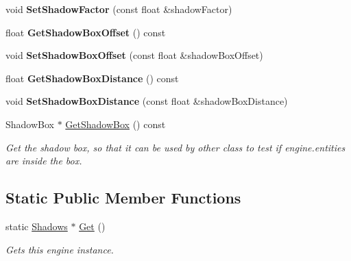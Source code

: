 \begin{DoxyCompactItemize}
\mbox{\label{class_flounder_1_1_shadows_ac793bf6b366f5bd560afdd2be13b505f}} 
void {\bfseries Set\+Shadow\+Factor} (const float \&shadow\+Factor)
\item 
\mbox{\label{class_flounder_1_1_shadows_a96f59857f80173cbdb3b1fff44bb815c}} 
float {\bfseries Get\+Shadow\+Box\+Offset} () const
\item 
\mbox{\label{class_flounder_1_1_shadows_a609e0d288ea936049fc89aec8c3bebbd}} 
void {\bfseries Set\+Shadow\+Box\+Offset} (const float \&shadow\+Box\+Offset)
\item 
\mbox{\label{class_flounder_1_1_shadows_a9a94c490ab6a8fb142e37504082078a6}} 
float {\bfseries Get\+Shadow\+Box\+Distance} () const
\item 
\mbox{\label{class_flounder_1_1_shadows_a5eef9f26b24bd85a943a4610622fa65d}} 
void {\bfseries Set\+Shadow\+Box\+Distance} (const float \&shadow\+Box\+Distance)
\item 
Shadow\+Box $\ast$ \hyperlink{class_flounder_1_1_shadows_a358a70d59e5a742b63e3b4acd9a23910}{Get\+Shadow\+Box} () const
\begin{DoxyCompactList}\small\item\em Get the shadow box, so that it can be used by other class to test if engine.\+entities are inside the box. \end{DoxyCompactList}\end{DoxyCompactItemize}
\subsection*{Static Public Member Functions}
\begin{DoxyCompactItemize}
\item 
static \hyperlink{class_flounder_1_1_shadows}{Shadows} $\ast$ \hyperlink{class_flounder_1_1_shadows_a789d274c9a6cf64eea8f36daa045e119}{Get} ()
\begin{DoxyCompactList}\small\item\em Gets this engine instance. \end{DoxyCompactList}\end{DoxyCompactItemize}
